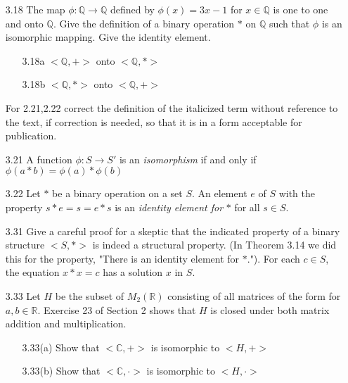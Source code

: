 \documentclass[12pt]{article}
\newcommand{\C}{\mathbb{C}}
\newcommand{\R}{\mathbb{R}}
\newcommand{\Q}{\mathbb{Q}}
\begin{document}
\begin{enumerate}
\begin{enumerate}
			\item[3.18] The map $\phi: \Q \rightarrow \Q$ defined by $\phi(x)=3x-1$ for $x \in \Q$ is one to one and onto $\Q$. Give the definition of a binary operation $\ast$ on $\Q$ such that $\phi$ is an isomorphic mapping. Give the identity element.
			\begin{enumerate}
				\item[3.18a]
				$<\Q,+>$ onto $<\Q,\ast>$
				\item[3.18b]
				$<\Q,\ast>$ onto $<\Q,+>$
				
			\end{enumerate}
			
			
			For 2.21,2.22 correct the definition of the italicized term without  reference to the text, if correction is needed, so that it is in a form acceptable for publication.
			
			\item[3.21] A function $\phi:S \rightarrow S'$ is an \textit{isomorphism} if and only if $\phi(a\ast b) = \phi(a) \ast \phi(b)$
			
			\item[3.22] Let $\ast$ be a binary operation on a set $S$. An element $e$ of $S$ with the property $s \ast e = s = e  \ast s$ is an \textit{identity element for} $\ast$ for all $s \in S$.
			
			\item[3.31] Give a careful proof for a skeptic that the indicated property of a binary structure $<S,\ast>$ is indeed a structural property. (In Theorem 3.14 we did this for the property, "There is an identity element for $\ast$."). For each $c \in S$, the equation $x \ast x = c$ has a solution $x$ in $S$.
			
			\item[3.33] Let $H$ be the subset of $M_2(\R)$ consisting of all matrices of the form for $a,b \in \R$. Exercise 23 of Section 2 shows that $H$ is closed under both matrix addition and multiplication.
			
			\begin{enumerate}
				\item[3.33(a)] Show that $<\C,+>$ is isomorphic to $<H,+>$ 
				\item[3.33(b)] Show that $<\C,\cdot>$ is isomorphic to $<H,\cdot>$
			\end{enumerate}
		\end{enumerate}
		
		
	\end{enumerate}
\end{document}
